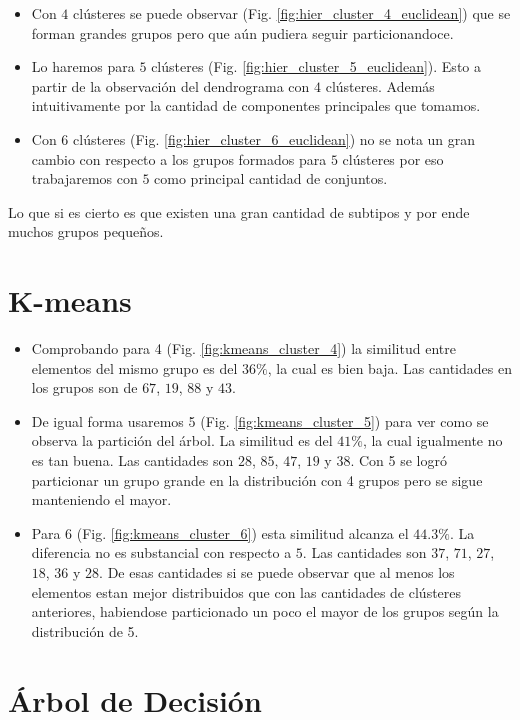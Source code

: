 \documentclass[a4paper,10pt,twocolumn]{article}
\begin{document}
	\begin{itemize}
		\item Con $4$ clústeres se puede observar (Fig. \ref{fig:hier_cluster_4_euclidean}) que se forman grandes grupos pero que aún pudiera seguir particionandoce.
		\item Lo haremos para $5$ clústeres (Fig. \ref{fig:hier_cluster_5_euclidean}). Esto a partir de la observación del dendrograma con $4$ clústeres. Además intuitivamente por la cantidad de componentes principales que tomamos.
		\item Con $6$ clústeres (Fig. \ref{fig:hier_cluster_6_euclidean}) no se nota un gran cambio con respecto a los grupos formados para $5$ clústeres por eso trabajaremos con $5$ como principal cantidad de conjuntos.
	\end{itemize}
	
	Lo que si es cierto es que existen una gran cantidad de subtipos y por ende muchos grupos pequeños.
	
	\section{K-means}\label{sec:kmeans}
	
	\begin{itemize}
		\item Comprobando para 4 (Fig. \ref{fig:kmeans_cluster_4}) la similitud entre elementos del mismo grupo es del $36\%$, la cual es bien baja. Las cantidades en los grupos son de $67$, $19$, $88$ y $43$.
		\item De igual forma usaremos 5 (Fig. \ref{fig:kmeans_cluster_5}) para ver como se observa la partición del árbol. La similitud es del $41\%$, la cual igualmente no es tan buena. Las cantidades son $28$, $85$, $47$, $19$ y $38$. Con 5 se logró particionar un grupo grande en la distribución con 4 grupos pero se sigue manteniendo el mayor.
		\item Para 6 (Fig. \ref{fig:kmeans_cluster_6}) esta similitud alcanza el $44.3\%$. La diferencia no es substancial con respecto a $5$. Las cantidades son $37$, $71$, $27$, $18$, $36$ y $28$. De esas cantidades si se puede observar que al menos los elementos estan mejor distribuidos que con las cantidades de clústeres anteriores, habiendose particionado un poco el mayor de los grupos según la distribución de 5.
	\end{itemize}
	
	\section{Árbol de Decisión}\label{sec:dtree}
	
\end{document}

